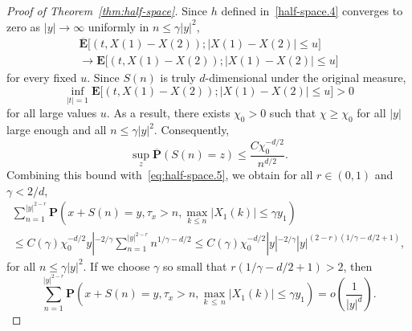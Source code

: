 \documentclass[10pt]{amsart}
\theoremstyle{definition}\newtheorem{defi}[theo]{Definition}\newtheorem{rema}[theo]{Remark}\newtheorem{exam}[theo]{Example}\newtheorem{exem}[theo]{Example}\newtheorem{nota}[theo]{Notation}
\newcommand{\pr}{\mathbf{P}}
\newcommand{\e}{\mathbf{E}}
\renewcommand{\le}{\leqslant}
\renewcommand{\ge}{\geqslant}
\begin{document}
\begin{proof}[Proof of Theorem~\ref{thm:half-space}]
Since $h$ defined in~\eqref{half-space.4} converges to zero as $|y|\to\infty$ uniformly in $n\le \gamma| y|^2$,
\begin{multline*}
\overline{\e}\big[\left(t,X(1)-X(2)\right);\left|X(1)-X(2)\right|\le u\big]\\
\to\e\big[\left(t,X(1)-X(2)\right);\left| X(1)-X(2)\right|\le u\big]
\end{multline*}
for every fixed $u$. Since $S(n)$ is truly $d$-dimensional under the original measure,
\[
\inf_{|t|=1}\e\big[\left(t,X(1)-X(2)\right);\left| X(1)-X(2)\right|\le u\big]>0
\]
for all large values $u$. As a result, there exists $\chi_0>0$ such that $\chi\ge\chi_0$ for all $| y|$ large enough and all $n\le \gamma| y|^2$. Consequently,
\begin{equation}\label{half-space.6}
\sup_z\overline{\pr}(S(n)=z)\le \frac{C\chi_0^{-d/2}}{n^{d/2}}.
\end{equation}
Combining this bound with~\eqref{eq:half-space.5}, we obtain for all $r\in(0,1)$ and $\gamma<2/d$,
\begin{multline}\label{eq:new.est.3}
\sum_{n=1}^{|y|^{2-r}} \pr\left(x+S(n)=y,\tau_x>n,\max_{k\le n}| X_1(k)|\le\gamma y_1\right)\\
\le C(\gamma)\chi_0^{-d/2} y|^{-2/\gamma} \sum_{n=1}^{|y|^{2-r}}n^{1/\gamma-d/2}
\le C(\gamma)\chi_0^{-d/2}|y|^{-2/\gamma}|y|^{(2-r)(1/\gamma-d/2+1)},
\end{multline}
for all $n\le \gamma| y|^2$. If we choose $\gamma$ so small that $r(1/\gamma-d/2+1)>2$, then
\begin{equation}\label{half-space.7}
\sum_{n=1}^{| y|^{2-r}} \pr\left(x+S(n)=y,\tau_x>n,\max_{k\,\le\,n}| X_1(k)|\le\gamma y_1\right) =o\left(\frac{1}{| y|^d}\right).
\end{equation}


\end{proof}
\end{document}
